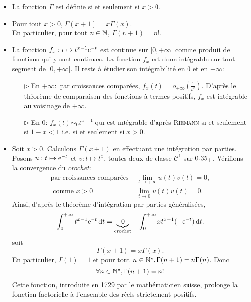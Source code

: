 \begin{prop}{}
    \begin{itemize}
        \item La fonction $\Gamma$ est définie si et seulement si $x>0$.
        \item Pour tout $x > 0$, $\Gamma(x+1) = x\Gamma(x)$. \\
        En particulier, pour tout $n \in \mathbb{N}$, $\Gamma(n+1) = n!$. 
    \end{itemize}
\end{prop}

\begin{preuve}
    \begin{itemize}
        \item La fonction $f_x:t \mapsto t^{x-1} \mathrm{e}^{-t}$ est continue sur $]0, + \infty[$ comme produit de fonctions qui y sont continues. La fonction $f_x$ est donc intégrable sur tout segment de $]0, +\infty[$. Il reste à étudier son intégrabilité en $0$ et en $+ \infty$:
        \begin{itemize}
            \item[$\triangleright$] En $+\infty:$ par croissances comparées, $f_x(t) = o_{+\infty} \left(\frac{1}{t^2} \right)$. D'après le théorème de comparaison des fonctions à termes positifs, $f_x$ est intégrable au voisinage de $+\infty$.
            \item[$\triangleright$] En $0$: $f_x(t) \sim_0 t^{x-1}$ qui est intégrable d'après \textsc{Riemann} si et seulement si $1-x < 1$ i.e. si et seulement si $x > 0$.
        \end{itemize}

        \item Soit $x > 0$. Calculons $\Gamma(x+1)$ en effectuant une intégration par parties. Posons $u:t \mapsto \mathrm{e}^{-t}$ et $v:t \mapsto t^x$, toutes deux de classe $\mathscr{C}^1$ sur $0.35_+$. Vérifions la convergence du \emph{crochet}:
        \begin{align*}
            \text{par croissances comparées } & \lim_{t \to +\infty} u(t) v(t) = 0, \\
            \text{ comme } x > 0 & \lim_{t \to 0} u(t) v(t) = 0.
        \end{align*}
        Ainsi, d'après le théorème d'intégration par parties généralisées, 
        $$\int_{0}^{+\infty} t^{x-1} \mathrm{e}^{-t} \, \mathrm{d} t = \underbrace{0}_{\text{crochet}} - \int_{0}^{+\infty} xt^{x-1} (-\mathrm{e}^{-t}) \, \mathrm{d} t.$$
        soit 
        $$\Gamma(x+1) = x \Gamma(x).$$
        En particulier, $\Gamma(1) = 1$ et pour tout $n \in \mathbb{N}^\star, \Gamma(n+1) = n \Gamma(n)$. Donc
        $$\forall n \in \mathbb{N}^\star, \Gamma(n+1) = n!$$
        Cette fonction, introduite en 1729 par le mathématicien suisse, prolonge la fonction factorielle à l'ensemble des réels strictement positifs.
    \end{itemize}
\end{preuve}

